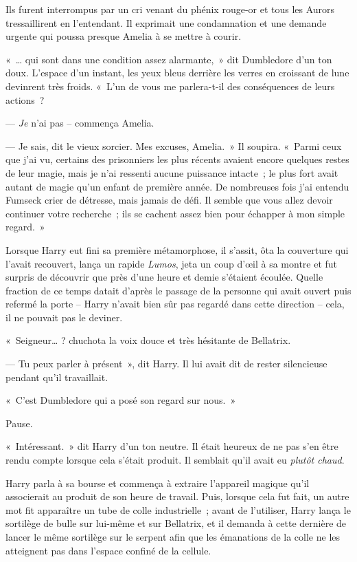 Ils furent interrompus par un cri venant du phénix rouge-or et tous les Aurors tressaillirent en l'entendant.
Il exprimait une condamnation et une demande urgente qui poussa presque Amelia à se mettre à courir.

«~… qui sont dans une condition assez alarmante,~» dit Dumbledore d'un ton doux.
L'espace d'un instant, les yeux bleus derrière les verres en croissant de lune devinrent très froids.
«~L'un de vous me parlera-t-il des conséquences de leurs actions~?

--- \emph{Je} n'ai pas --  commença Amelia.

--- Je sais, dit le vieux sorcier.
Mes excuses, Amelia.~»
Il soupira.
«~Parmi ceux que j'ai vu, certains des prisonniers les plus récents avaient encore quelques restes de leur magie, mais je n'ai ressenti aucune puissance intacte~; le plus fort avait autant de magie qu'un enfant de première année.
De nombreuses fois j'ai entendu Fumseck crier de détresse, mais jamais de défi.
Il semble que vous allez devoir continuer votre recherche~; ils se cachent assez bien pour échapper à mon simple regard.~»

\later

Lorsque Harry eut fini sa première métamorphose, il s'assit, ôta la couverture qui l'avait recouvert, lança un rapide \emph{Lumos}, jeta un coup d'œil à sa montre et fut surpris de découvrir que près d'une heure et demie s'étaient écoulée.
Quelle fraction de ce temps datait d'après le passage de la personne qui avait ouvert puis refermé la porte -- Harry n'avait bien sûr pas regardé dans cette direction -- cela, il ne pouvait pas le deviner.

«~Seigneur…
? chuchota la voix douce et très hésitante de Bellatrix.

--- Tu peux parler à présent~», dit Harry.
Il lui avait dit de rester silencieuse pendant qu'il travaillait.

«~C'est Dumbledore qui a posé son regard sur nous.~»

Pause.

«~Intéressant.~»
dit Harry d'un ton neutre.
Il était heureux de ne pas s'en être rendu compte lorsque cela s'était produit.
Il semblait qu'il avait eu \emph{plutôt chaud}.

Harry parla à sa bourse et commença à extraire l'appareil magique qu'il associerait au produit de son heure de travail.
Puis, lorsque cela fut fait, un autre mot fit apparaître un tube de colle industrielle~; avant de l'utiliser, Harry lança le sortilège de bulle sur lui-même et sur Bellatrix, et il demanda à cette dernière de lancer le même sortilège sur le serpent afin que les émanations de la colle ne les atteignent pas dans l'espace confiné de la cellule.

